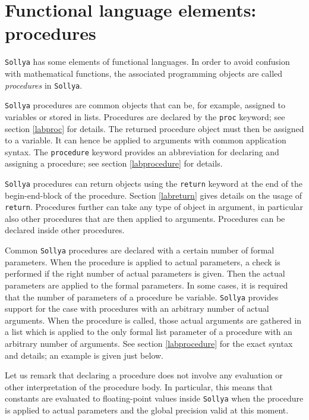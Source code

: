 \documentclass[a4paper]{article}
\newcommand{\key}[1]{\texttt{#1}}
\newcommand{\sollya}{\texttt{Sollya}\xspace}
\begin{document}


\section{Functional language elements: procedures}

\sollya has some elements of functional languages. In order to 
avoid confusion with mathematical functions, the associated 
programming objects are called \emph{procedures} in \sollya. 

\sollya procedures are common objects that can be, for example,
assigned to variables or stored in lists. Procedures are declared by
the \key{proc} keyword; see section \ref{labproc} for details. The
returned procedure object must then be assigned to a variable. It can
hence be applied to arguments with common application syntax. The
\key{procedure} keyword provides an abbreviation for declaring and
assigning a procedure; see section \ref{labprocedure} for details.

\sollya procedures can return objects using the \key{return} keyword
at the end of the begin-end-block of the procedure. Section
\ref{labreturn} gives details on the usage of \key{return}. Procedures
further can take any type of object in argument, in particular also
other procedures that are then applied to arguments. Procedures can
be declared inside other procedures. 

Common \sollya procedures are declared with a certain number of formal
parameters. When the procedure is applied to actual parameters, a
check is performed if the right number of actual parameters is
given. Then the actual parameters are applied to the formal
parameters. In some cases, it is required that the number of
parameters of a procedure be variable. \sollya provides support for
the case with procedures with an arbitrary number of actual arguments.
When the procedure is called, those actual arguments are gathered in a
list which is applied to the only formal list parameter of a procedure
with an arbitrary number of arguments. See section \ref{labprocedure}
for the exact syntax and details; an example is given just below.

Let us remark that declaring a procedure does not involve any evaluation or
other interpretation of the procedure body. In particular, this means
that constants are evaluated to floating-point values inside \sollya
when the procedure is applied to actual parameters and the global
precision valid at this moment.
\end{document}

